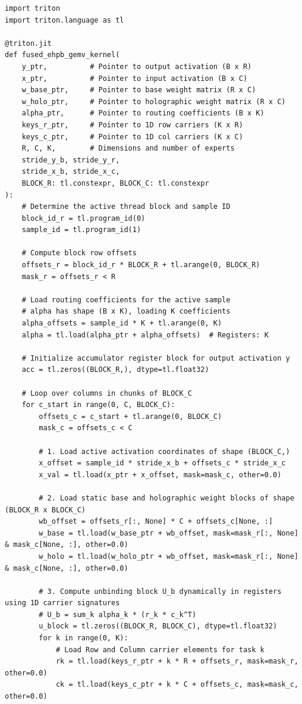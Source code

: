 \documentclass{article}
\theoremstyle{plain}
\theoremstyle{definition}
\theoremstyle{remark}
\begin{document}
\begin{verbatim}
import triton
import triton.language as tl

@triton.jit
def fused_ehpb_gemv_kernel(
    y_ptr,          # Pointer to output activation (B x R)
    x_ptr,          # Pointer to input activation (B x C)
    w_base_ptr,     # Pointer to base weight matrix (R x C)
    w_holo_ptr,     # Pointer to holographic weight matrix (R x C)
    alpha_ptr,      # Pointer to routing coefficients (B x K)
    keys_r_ptr,     # Pointer to 1D row carriers (K x R)
    keys_c_ptr,     # Pointer to 1D col carriers (K x C)
    R, C, K,        # Dimensions and number of experts
    stride_y_b, stride_y_r,
    stride_x_b, stride_x_c,
    BLOCK_R: tl.constexpr, BLOCK_C: tl.constexpr
):
    # Determine the active thread block and sample ID
    block_id_r = tl.program_id(0)
    sample_id = tl.program_id(1)
    
    # Compute block row offsets
    offsets_r = block_id_r * BLOCK_R + tl.arange(0, BLOCK_R)
    mask_r = offsets_r < R
    
    # Load routing coefficients for the active sample
    # alpha has shape (B x K), loading K coefficients
    alpha_offsets = sample_id * K + tl.arange(0, K)
    alpha = tl.load(alpha_ptr + alpha_offsets)  # Registers: K
    
    # Initialize accumulator register block for output activation y
    acc = tl.zeros((BLOCK_R,), dtype=tl.float32)
    
    # Loop over columns in chunks of BLOCK_C
    for c_start in range(0, C, BLOCK_C):
        offsets_c = c_start + tl.arange(0, BLOCK_C)
        mask_c = offsets_c < C
        
        # 1. Load active activation coordinates of shape (BLOCK_C,)
        x_offset = sample_id * stride_x_b + offsets_c * stride_x_c
        x_val = tl.load(x_ptr + x_offset, mask=mask_c, other=0.0)
        
        # 2. Load static base and holographic weight blocks of shape (BLOCK_R x BLOCK_C)
        wb_offset = offsets_r[:, None] * C + offsets_c[None, :]
        w_base = tl.load(w_base_ptr + wb_offset, mask=mask_r[:, None] & mask_c[None, :], other=0.0)
        w_holo = tl.load(w_holo_ptr + wb_offset, mask=mask_r[:, None] & mask_c[None, :], other=0.0)
        
        # 3. Compute unbinding block U_b dynamically in registers using 1D carrier signatures
        # U_b = sum_k alpha_k * (r_k * c_k^T)
        u_block = tl.zeros((BLOCK_R, BLOCK_C), dtype=tl.float32)
        for k in range(0, K):
            # Load Row and Column carrier elements for task k
            rk = tl.load(keys_r_ptr + k * R + offsets_r, mask=mask_r, other=0.0)
            ck = tl.load(keys_c_ptr + k * C + offsets_c, mask=mask_c, other=0.0)
            

\end{verbatim}
\end{document}
